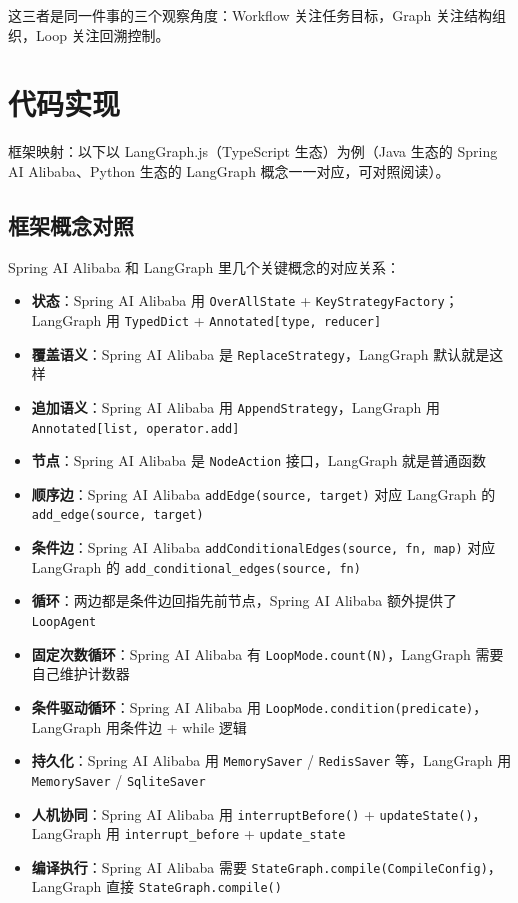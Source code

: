 \documentclass[9pt,a4paper,twocolumn]{ctexart}
\begin{document}
这三者是同一件事的三个观察角度：Workflow 关注任务目标，Graph 关注结构组织，Loop 关注回溯控制。



\section*{代码实现}


框架映射：以下以 LangGraph.js（TypeScript 生态）为例（Java 生态的 Spring AI Alibaba、Python 生态的 LangGraph 概念一一对应，可对照阅读）。



\subsection*{框架概念对照}


Spring AI Alibaba 和 LangGraph 里几个关键概念的对应关系：


\begin{itemize}[itemsep=1pt, topsep=2pt]
  \item \textbf{状态}：Spring AI Alibaba 用 \texttt{OverAllState} + \texttt{KeyStrategyFactory}；LangGraph 用 \texttt{TypedDict} + \texttt{Annotated[type, reducer]}
  \item \textbf{覆盖语义}：Spring AI Alibaba 是 \texttt{ReplaceStrategy}，LangGraph 默认就是这样
  \item \textbf{追加语义}：Spring AI Alibaba 用 \texttt{AppendStrategy}，LangGraph 用 \texttt{Annotated[list, operator.add]}
  \item \textbf{节点}：Spring AI Alibaba 是 \texttt{NodeAction} 接口，LangGraph 就是普通函数
  \item \textbf{顺序边}：Spring AI Alibaba \texttt{addEdge(source, target)} 对应 LangGraph 的 \texttt{add\_edge(source, target)}
  \item \textbf{条件边}：Spring AI Alibaba \texttt{addConditionalEdges(source, fn, map)} 对应 LangGraph 的 \texttt{add\_conditional\_edges(source, fn)}
  \item \textbf{循环}：两边都是条件边回指先前节点，Spring AI Alibaba 额外提供了 \texttt{LoopAgent}
  \item \textbf{固定次数循环}：Spring AI Alibaba 有 \texttt{LoopMode.count(N)}，LangGraph 需要自己维护计数器
  \item \textbf{条件驱动循环}：Spring AI Alibaba 用 \texttt{LoopMode.condition(predicate)}，LangGraph 用条件边 + while 逻辑
  \item \textbf{持久化}：Spring AI Alibaba 用 \texttt{MemorySaver} / \texttt{RedisSaver} 等，LangGraph 用 \texttt{MemorySaver} / \texttt{SqliteSaver}
  \item \textbf{人机协同}：Spring AI Alibaba 用 \texttt{interruptBefore()} + \texttt{updateState()}，LangGraph 用 \texttt{interrupt\_before} + \texttt{update\_state}
  \item \textbf{编译执行}：Spring AI Alibaba 需要 \texttt{StateGraph.compile(CompileConfig)}，LangGraph 直接 \texttt{StateGraph.compile()}
\end{itemize}
\end{document}
